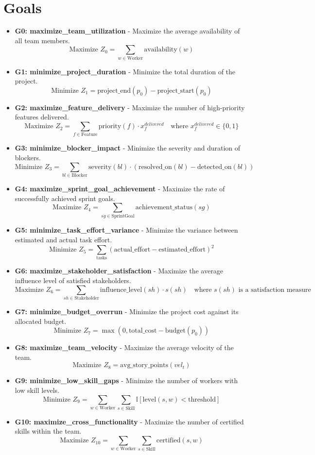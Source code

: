 \documentclass[11pt]{article}
\begin{document}
\section{Goals}
\begin{itemize}
    \item \textbf{G0: maximize\_team\_utilization} - Maximize the average availability of all team members.
        \[ \text{Maximize } Z_0 = \sum_{w \in \text{Worker}} \text{availability}(w) \]
    \item \textbf{G1: minimize\_project\_duration} - Minimize the total duration of the project.
        \[ \text{Minimize } Z_1 = \text{project\_end}(p_0) - \text{project\_start}(p_0) \]
    \item \textbf{G2: maximize\_feature\_delivery} - Maximize the number of high-priority features delivered.
        \[ \text{Maximize } Z_2 = \sum_{f \in \text{Feature}} \text{priority}(f) \cdot x^{delivered}_f \quad \text{where } x^{delivered}_f \in \{0,1\} \]
    \item \textbf{G3: minimize\_blocker\_impact} - Minimize the severity and duration of blockers.
        \[ \text{Minimize } Z_3 = \sum_{bl \in \text{Blocker}} \text{severity}(bl) \cdot (\text{resolved\_on}(bl) - \text{detected\_on}(bl)) \]
    \item \textbf{G4: maximize\_sprint\_goal\_achievement} - Maximize the rate of successfully achieved sprint goals.
        \[ \text{Maximize } Z_4 = \sum_{sg \in \text{SprintGoal}} \text{achievement\_status}(sg) \]
    \item \textbf{G5: minimize\_task\_effort\_variance} - Minimize the variance between estimated and actual task effort.
        \[ \text{Minimize } Z_5 = \sum_{\text{tasks}} (\text{actual\_effort} - \text{estimated\_effort})^2 \]
    \item \textbf{G6: maximize\_stakeholder\_satisfaction} - Maximize the average influence level of satisfied stakeholders.
        \[ \text{Maximize } Z_6 = \sum_{sh \in \text{Stakeholder}} \text{influence\_level}(sh) \cdot s(sh) \quad \text{where } s(sh) \text{ is a satisfaction measure} \]
    \item \textbf{G7: minimize\_budget\_overrun} - Minimize the project cost against its allocated budget.
        \[ \text{Minimize } Z_7 = \max(0, \text{total\_cost} - \text{budget}(p_0)) \]
    \item \textbf{G8: maximize\_team\_velocity} - Maximize the average velocity of the team.
        \[ \text{Maximize } Z_8 = \text{avg\_story\_points}(vel_t) \]
    \item \textbf{G9: minimize\_low\_skill\_gaps} - Minimize the number of workers with low skill levels.
        \[ \text{Minimize } Z_9 = \sum_{w \in \text{Worker}} \sum_{s \in \text{Skill}} \mathbb{I}[\text{level}(s, w) < \text{threshold}] \]
    \item \textbf{G10: maximize\_cross\_functionality} - Maximize the number of certified skills within the team.
        \[ \text{Maximize } Z_{10} = \sum_{w \in \text{Worker}} \sum_{s \in \text{Skill}} \text{certified}(s, w) \]
\end{itemize}
\end{document}
